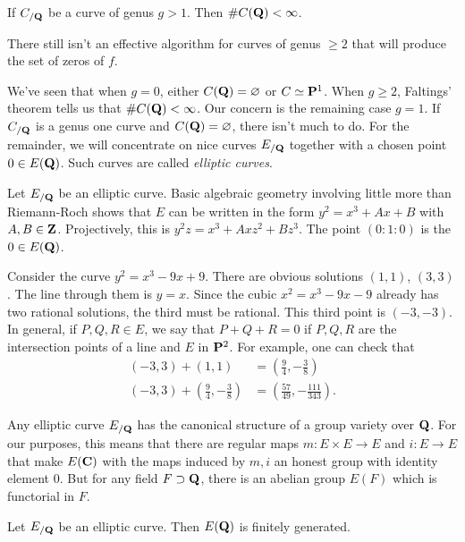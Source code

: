 \begin{theorem}[Faltings]
If $C_{/\mathbf{Q}}$ be a curve of genus $g>1$. Then $\# C(\mathbf{Q})<\infty$. 
\end{theorem}
There still isn't an effective algorithm for curves of genus $\geqslant 2$ that 
will produce the set of zeros of $f$. 

We've seen that when $g=0$, either $C(\mathbf{Q})=\varnothing$ or 
$C\simeq \mathbf{P}^1$. When $g\geqslant 2$, Faltings' theorem tells us that 
$\# C(\mathbf{Q})<\infty$. Our concern is the remaining case $g=1$. If $C_{/\mathbf{Q}}$ is 
a genus one curve and $C(\mathbf{Q})=\varnothing$, there isn't much to do. For the 
remainder, we will concentrate on nice curves $E_{/\mathbf{Q}}$ together with a chosen 
point $0\in E(\mathbf{Q})$. Such curves are called \emph{elliptic curves}. 

Let $E_{/\mathbf{Q}}$ be an elliptic curve. Basic algebraic geometry involving little 
more than Riemann-Roch shows that $E$ can be written in the form 
$y^2=x^3+A x+B$ with $A,B\in \mathbf{Z}$. Projectively, this is
$y^2 z=x^3 + A x z^2+B z^3$. The point $(0:1:0)$ is the $0\in E(\mathbf{Q})$. 

\begin{example}
Consider the curve $y^2=x^3-9 x+9$. There are obvious solutions 
$(1,1)$, $(3,3)$. The line through them is $y=x$. Since the cubic 
$x^2=x^3-9 x-9$ already has two rational solutions, the third must be rational. 
This third point is  $(-3,-3)$. In general, if $P,Q,R\in E$, we say that 
$P+Q+R=0$ if $P,Q,R$ are the intersection points of a line and $E$ in 
$\mathbf{P}^2$. For example, one can check that 
\begin{align*}
  (-3,3)+(1,1) &= (\frac 9 4, -\frac 3 8) \\
  (-3,3)+\left(\frac 9 4, -\frac 3 8\right) &= \left(\frac{57}{49},-\frac{111}{343}\right).
\end{align*} 
\end{example}

Any elliptic curve $E_{/\mathbf{Q}}$ has the canonical structure of a group variety 
over $\mathbf{Q}$. For our purposes, this means that there are regular maps 
$m:E\times E\to E$ and $i:E\to E$ that make $E(\mathbf{C})$ with the maps induced by 
$m,i$ an honest group with identity element $0$. But for any field 
$F\supset \mathbf{Q}$, there is an abelian group $E(F)$ which is functorial in $F$. 

\begin{theorem}
Let $E_{/\mathbf{Q}}$ be an elliptic curve. Then $E(\mathbf{Q})$ is finitely generated. 
\end{theorem}

